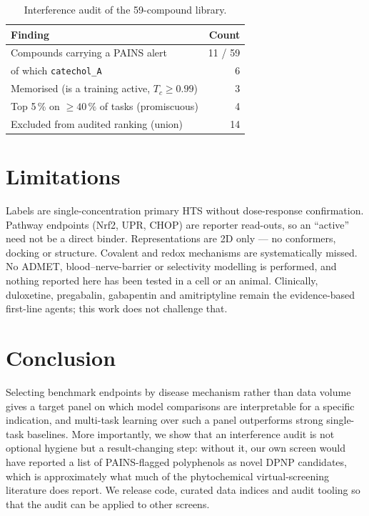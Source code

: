 \documentclass[conference]{IEEEtran}
\begin{document}
\begin{table}[t]
\caption{Interference audit of the 59-compound library.}
\label{tab:audit}
\centering\footnotesize
\begin{tabular}{@{}lr@{}}
\toprule
Finding & Count \\
\midrule
Compounds carrying a PAINS alert & 11 / 59 \\
\quad of which \texttt{catechol\_A} & 6 \\
Memorised (is a training active, $T_c \ge 0.99$) & 3 \\
Top 5\,\% on $\ge 40\,\%$ of tasks (promiscuous) & 4 \\
Excluded from audited ranking (union) & 14 \\
\bottomrule
\end{tabular}
\end{table}

\section{Limitations}
Labels are single-concentration primary HTS without dose-response confirmation.
Pathway endpoints (Nrf2, UPR, CHOP) are reporter read-outs, so an ``active'' need
not be a direct binder. Representations are 2D only --- no conformers, docking or
structure. Covalent and redox mechanisms are systematically missed. No ADMET,
blood--nerve-barrier or selectivity modelling is performed, and nothing reported
here has been tested in a cell or an animal. Clinically, duloxetine, pregabalin,
gabapentin and amitriptyline remain the evidence-based first-line agents; this
work does not challenge that.

\section{Conclusion}
Selecting benchmark endpoints by disease mechanism rather than data volume gives
a target panel on which model comparisons are interpretable for a specific
indication, and multi-task learning over such a panel outperforms strong
single-task baselines. More importantly, we show that an interference audit is
not optional hygiene but a result-changing step: without it, our own screen would
have reported a list of PAINS-flagged polyphenols as novel DPNP candidates, which
is approximately what much of the phytochemical virtual-screening literature does
report. We release code, curated data indices and audit tooling so that the audit
can be applied to other screens.
\end{document}
